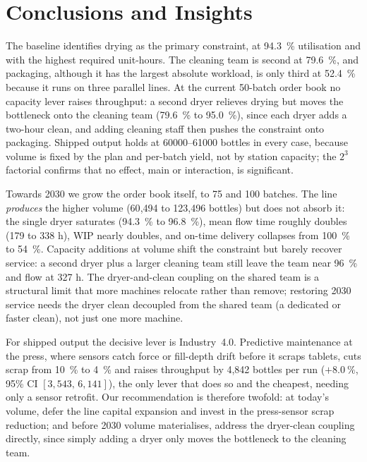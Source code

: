 \section{Conclusions and Insights}
\label{sec:conclusions}

The baseline identifies drying as the primary constraint, at \SI{94.3}{\percent}
utilisation and with the highest required unit-hours. The cleaning team is second
at \SI{79.6}{\percent}, and packaging, although it has the largest absolute
workload, is only third at \SI{52.4}{\percent} because it runs on three parallel
lines. At the current 50-batch order book no capacity lever raises throughput: a
second dryer relieves drying but moves the bottleneck onto the cleaning team
(\SI{79.6}{\percent} to \SI{95.0}{\percent}), since each dryer adds a two-hour
clean, and adding cleaning staff then pushes the constraint onto packaging.
Shipped output holds at \numrange{60000}{61000} bottles in every case, because
volume is fixed by the plan and per-batch yield, not by station capacity; the
$2^3$ factorial confirms that no effect, main or interaction, is significant.

Towards 2030 we grow the order book itself, to 75 and 100 batches. The line
\emph{produces} the higher volume (60{,}494 to 123{,}496 bottles) but does not
absorb it: the single dryer saturates (\SI{94.3}{\percent} to \SI{96.8}{\percent}),
mean flow time roughly doubles (179 to 338 h), WIP nearly doubles, and on-time
delivery collapses from \SI{100}{\percent} to \SI{54}{\percent}. Capacity additions
at volume shift the constraint but barely recover service: a second dryer plus a
larger cleaning team still leave the team near \SI{96}{\percent} and flow at 327 h.
The dryer-and-clean coupling on the shared team is a structural limit that more
machines relocate rather than remove; restoring 2030 service needs the dryer clean
decoupled from the shared team (a dedicated or faster clean), not just one more
machine.

For shipped output the decisive lever is Industry~4.0. Predictive maintenance at
the press, where sensors catch force or fill-depth drift before it scraps tablets,
cuts scrap from \SI{10}{\percent} to \SI{4}{\percent} and raises throughput by
4{,}842 bottles per run ($+\SI{8.0}{\percent}$, 95\% CI $[3{,}543,\,6{,}141]$),
the only lever that does so and the cheapest, needing only a sensor retrofit. Our
recommendation is therefore twofold: at today's volume, defer the line capital
expansion and invest in the press-sensor scrap reduction; and before 2030 volume
materialises, address the dryer-clean coupling directly, since simply adding a
dryer only moves the bottleneck to the cleaning team.
